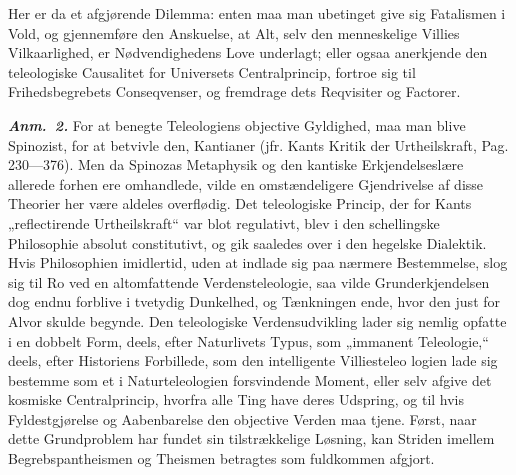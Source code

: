 \documentclass[12pt]{book}
\newcommand{\anm}[1]{\emph{\textbf{Anm.~#1.}}}
\newcommand{\opage}[1]{\marginnote{\footnotesize\textit{[#1]}}}
\begin{document}
Her er da et afgjørende Dilemma: enten maa man ubetinget give sig
Fatalismen i Vold, og gjennemføre den Anskuelse, at Alt, selv den
menneskelige Villies Vilkaarlighed, er Nødvendighedens Love
underlagt; eller ogsaa anerkjende den teleologiske Causalitet for
Universets Centralprincip, fortroe sig til Frihedsbegrebets
Conseqvenser, og fremdrage dets Reqvisiter og Factorer.

\anm{2} For at benegte Teleologiens objective Gyldighed, maa man
blive Spinozist, for at betvivle den, Kantianer (jfr. Kants Kritik
der Urtheilskraft, Pag. 230---376). Men da Spinozas Metaphysik og
den kantiske Erkjendelseslære allerede forhen ere omhandlede, vilde
en omstændeligere Gjendrivelse af disse Theorier her være aldeles
overflødig. Det teleologiske Princip, der for Kants „reflectirende
Urtheilskraft“ var blot regulativt, blev i den schellingske
Philosophie absolut constitutivt, og gik saaledes over i den
hegelske Dialektik. Hvis Philosophien imidlertid, uden at indlade
sig paa nærmere Bestemmelse, slog sig til Ro ved en altomfattende
Verdensteleologie, saa vilde Grunderkjendelsen dog endnu forblive i
tvetydig Dunkelhed, og Tænkningen ende, hvor den just for Alvor
skulde begynde. Den teleologiske Verdensudvikling lader sig nemlig
opfatte i en dobbelt Form, deels, efter Naturlivets Typus, som
„immanent Teleologie,“ deels, efter Historiens Forbillede, som den
intelligente Villiesteleo%
\opage{230}logien lade sig bestemme som et i Naturteleologien forsvindende
Moment, eller selv afgive det kosmiske Centralprincip, hvorfra alle
Ting have deres Udspring, og til hvis Fyldestgjørelse og
Aabenbarelse den objective Verden maa tjene. Først, naar dette
Grundproblem har fundet sin tilstrækkelige Løsning, kan Striden
imellem Begrebspantheismen og Theismen betragtes som fuldkommen
afgjort.
\end{document}
